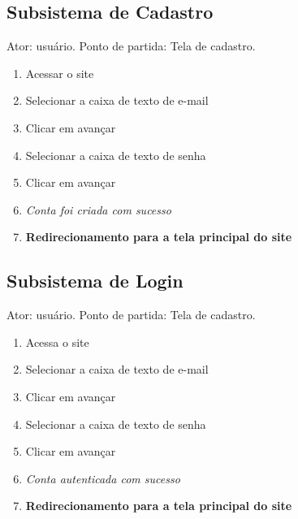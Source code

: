         \subsection{Subsistema de Cadastro}
            Ator: usuário.
            Ponto de partida: Tela de cadastro.
            \begin{enumerate}
                \item Acessar o site
                \item Selecionar a caixa de texto de e-mail
                \item Clicar em avançar
                \item Selecionar a caixa de texto de senha
                \item Clicar em avançar
                \item \textit{Conta foi criada com sucesso}
                \item \textbf{Redirecionamento para a tela principal do site}
            \end{enumerate}
        \subsection{Subsistema de Login}
            Ator: usuário.
            Ponto de partida: Tela de cadastro.
            \begin{enumerate}
                \item Acessa o site
                \item Selecionar a caixa de texto de e-mail
                \item Clicar em avançar
                \item Selecionar a caixa de texto de senha
                \item Clicar em avançar
                \item \textit{Conta autenticada com sucesso}
                \item \textbf{Redirecionamento para a tela principal do site}
            \end{enumerate}
